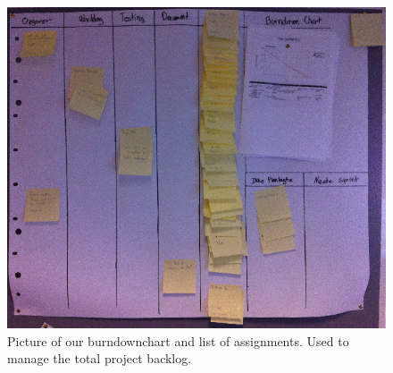 	
	\begin{figure}[H]
		\centering
			\includegraphics[width=\textwidth]{Images/burndown.png}
				\caption{Picture of our burndownchart and list of assignments. Used to manage the total project backlog.}
		\label{fig:burn}
	\end{figure}
	
